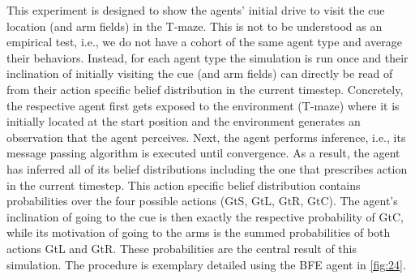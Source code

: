 This experiment is designed to show the agents' initial drive to visit the cue location (and arm fields) in the T-maze. This is not to be understood as an empirical test, i.e., we do not have a cohort of the same agent type and average their behaviors. Instead, for each agent type the simulation is run once and their inclination of initially visiting the cue (and arm fields) can directly be read of from their action specific belief distribution in the current timestep. Concretely, the respective agent first gets exposed to the environment (T-maze) where it is initially located at the start position and the environment generates an observation that the agent perceives. Next, the agent performs inference, i.e., its message passing algorithm is executed until convergence. As a result, the agent has inferred all of its belief distributions including the one that prescribes action in the current timestep. This action specific belief distribution contains probabilities over the four possible actions (GtS, GtL, GtR, GtC). The agent's inclination of going to the cue is then exactly the respective probability of GtC, while its motivation of going to the arms is the summed probabilities of both actions GtL and GtR. These probabilities are the central result of this simulation. The procedure is exemplary detailed using the BFE agent in \cref{fig:24}.


